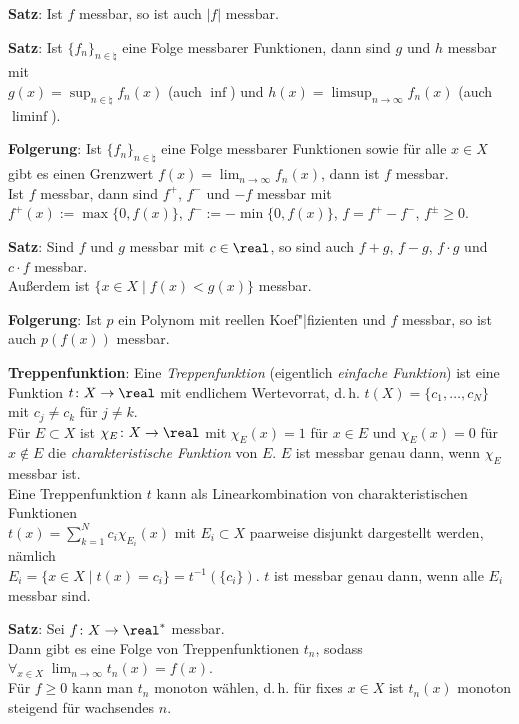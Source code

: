 \textbf{Satz}:
Ist $f$ messbar, so ist auch $|f|$ messbar.

\textbf{Satz}:
Ist $\{f_n\}_{n \in \natural}$ eine Folge messbarer Funktionen, dann sind
$g$ und $h$ messbar mit \\
$g(x) = \sup_{n \in \natural} f_n(x)$ (auch $\inf$) und
$h(x) = \limsup_{n \to \infty} f_n(x)$ (auch $\liminf$).

\textbf{Folgerung}:
Ist $\{f_n\}_{n \in \natural}$ eine Folge messbarer Funktionen sowie
für alle $x \in X$ gibt es einen Grenzwert $f(x) = \lim_{n \to \infty} f_n(x)$,
dann ist $f$ messbar. \\
Ist $f$ messbar, dann sind $f^+$, $f^-$ und $-f$ messbar mit \\
$f^+(x) := \max\{0, f(x)\}$, $f^- := -\min\{0, f(x)\}$,
$f = f^+ - f^-$, $f^\pm \ge 0$.

\textbf{Satz}:
Sind $f$ und $g$ messbar mit $c \in \real$, so sind auch
$f + g$, $f - g$, $f \cdot g$ und $c \cdot f$ messbar. \\
Außerdem ist $\{x \in X \;|\; f(x) < g(x)\}$ messbar.

\textbf{Folgerung}:
Ist $p$ ein Polynom mit reellen Koef"|fizienten und $f$ messbar,
so ist auch $p(f(x))$ messbar.

\linie

\textbf{Treppenfunktion}:
Eine \emph{Treppenfunktion} (eigentlich \emph{einfache Funktion})
ist eine Funktion $t\colon X \rightarrow \real$
mit endlichem Wertevorrat, d.\,h. $t(X) = \{c_1, \dotsc, c_N\}$ mit
$c_j \not= c_k$ für $j \not= k$. \\
Für $E \subset X$ ist $\chi_E\colon X \rightarrow \real$ mit
$\chi_E(x) = 1$ für $x \in E$ und $\chi_E(x) = 0$
für $x \notin E$ die \emph{charakteristische Funktion} von $E$.
$E$ ist messbar genau dann, wenn $\chi_E$ messbar ist. \\
Eine Treppenfunktion $t$ kann als Linearkombination von charakteristischen
Funktionen \\
$t(x) = \sum_{k=1}^N c_i \chi_{E_i}(x)$ mit $E_i \subset X$
paarweise disjunkt dargestellt werden, nämlich \\
$E_i = \{x \in X \;|\; t(x) = c_i\} = t^{-1}(\{c_i\})$.
$t$ ist messbar genau dann, wenn alle $E_i$ messbar sind.

\textbf{Satz}:
Sei $f\colon X \rightarrow \real^\ast$ messbar. \\
Dann gibt es eine Folge von Treppenfunktionen $t_n$, sodass
$\forall_{x \in X}\; \lim_{n \to \infty} t_n(x) = f(x)$. \\
Für $f \ge 0$ kann man $t_n$ monoton wählen, d.\,h. für fixes $x \in X$
ist $t_n(x)$ monoton steigend für wachsendes $n$.

